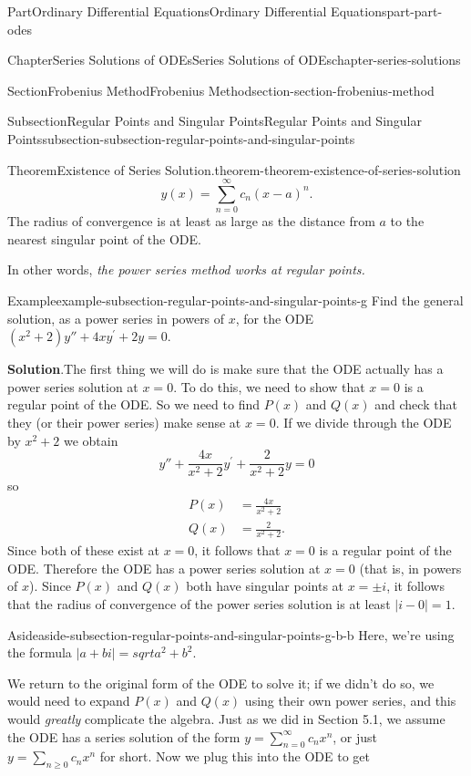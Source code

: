 \documentclass[twoside,10pt,]{book}
\newcommand{\blocktitlefont}{\relax}
\numberwithin{equation}{part}
\begin{document}
\begin{partptx}{Part}{Ordinary Differential Equations}{}{Ordinary Differential Equations}{}{}{part-part-odes}
\begin{chapterptx}{Chapter}{Series Solutions of ODEs}{}{Series Solutions of ODEs}{}{}{chapter-series-solutions}
\begin{sectionptx}{Section}{Frobenius Method}{}{Frobenius Method}{}{}{section-section-frobenius-method}
\begin{subsectionptx}{Subsection}{Regular Points and Singular Points}{}{Regular Points and Singular Points}{}{}{subsection-subsection-regular-points-and-singular-points}
\begin{theorem}{Theorem}{Existence of Series Solution.}{}{theorem-theorem-existence-of-series-solution}
\begin{equation*}
y(x) = \sum_{n=0}^{\infty}c_{n}(x-a)^{n}.
\end{equation*}
The radius of convergence is at least as large as the distance from \(a\) to the nearest singular point of the ODE.%
\end{theorem}
In other words, \emph{the power series method works at regular points.}%
\begin{example}{Example}{}{example-subsection-regular-points-and-singular-points-g}%
Find the general solution, as a power series in powers of \(x\), for the ODE \((x^{2}+2)y''+4xy^\prime+2y=0\).%
\par\smallskip%
\noindent\textbf{\blocktitlefont Solution}.\hypertarget{solution-subsection-regular-points-and-singular-points-g-b}{}\quad{}The first thing we will do is make sure that the ODE actually has a power series solution at \(x=0\). To do this, we need to show that \(x=0\) is a regular point of the ODE. So we need to find \(P(x)\) and \(Q(x)\) and check that they (or their power series) make sense at \(x=0\). If we divide through the ODE by \(x^{2}+2\) we obtain%
\begin{equation*}
y''+\frac{4x}{x^{2}+2}y^\prime+\frac{2}{x^{2}+2}y = 0
\end{equation*}
so%
\begin{align*}
P(x) &= \frac{4x}{x^{2}+2}\\
Q(x) &= \frac{2}{x^{2}+2}\text{.}
\end{align*}
Since both of these exist at \(x=0\), it follows that \(x=0\) is a regular point of the ODE. Therefore the ODE has a power series solution at \(x=0\) (that is, in powers of \(x\)). Since \(P(x)\) and \(Q(x)\) both have singular points at \(x=\pm i\), it follows that the radius of convergence of the power series solution is at least \(|i - 0| = 1\).%
\begin{aside}{Aside}{}{aside-subsection-regular-points-and-singular-points-g-b-b}%
Here, we're using the formula \(|a+bi| = sqrt{a^2 + b^2}.\)%
\end{aside}
We return to the original form of the ODE to solve it; if we didn't do so, we would need to expand \(P(x)\) and \(Q(x)\) using their own power series, and this would \emph{greatly} complicate the algebra. Just as we did in Section 5.1, we assume the ODE has a series solution of the form \(y = \sum_{n=0}^{\infty}c_{n}x^{n}\), or just \(y=\sum_{n\geq0}c_{n}x^{n}\) for short. Now we plug this into the ODE to get%
\begin{equation*}

\end{equation*}
\end{example}
\end{subsectionptx}
\end{sectionptx}
\end{chapterptx}
\end{partptx}
\end{document}
